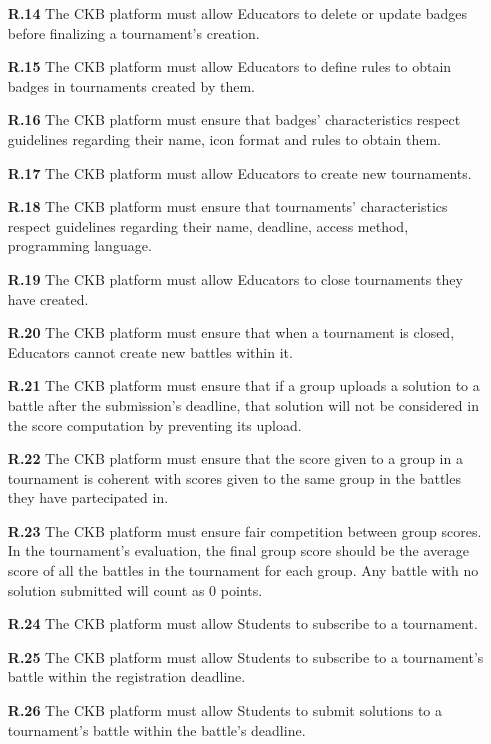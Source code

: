 \documentclass{article}
\begin{document}
{\begin{itemize}
    \item[\textbf{R.14}] The CKB platform must allow Educators to delete or update badges before finalizing a tournament's creation.
    \item[\textbf{R.15}] The CKB platform must allow Educators to define rules to obtain badges in tournaments created by them.
    \item[\textbf{R.16}] The CKB platform must ensure that badges' characteristics respect guidelines regarding their
          name, icon format and rules to obtain them.
    \item[\textbf{R.17}] The CKB platform must allow Educators to create new tournaments.
    \item[\textbf{R.18}] The CKB platform must ensure that tournaments' characteristics respect guidelines regarding their
          name, deadline, access method, programming language.
    \item[\textbf{R.19}] The CKB platform must allow Educators to close tournaments they have created.
    \item[\textbf{R.20}] The CKB platform must ensure that when a tournament is closed, Educators cannot create new battles
          within it.
    \item[\textbf{R.21}] The CKB platform must ensure that if a group uploads a solution to a battle after the submission's deadline,
          that solution will not be considered in the score computation by preventing its upload.
    \item[\textbf{R.22}] The CKB platform must ensure that the score given to a group in a tournament is
          coherent with scores given to the same group in the battles they have partecipated in.
    \item[\textbf{R.23}] The CKB platform must ensure fair competition between group scores. In the tournament's evaluation, the final
          group score should be the average score of all the battles in the tournament for each group. Any battle with no solution submitted will count
          as 0 points.
    \item[\textbf{R.24}] The CKB platform must allow Students to subscribe to a tournament.
    \item[\textbf{R.25}] The CKB platform must allow Students to subscribe to a tournament's battle
          within the registration deadline.
    \item[\textbf{R.26}] The CKB platform must allow Students to submit solutions to a tournament's battle
          within the battle's deadline.

\end{itemize}}
\end{document}

